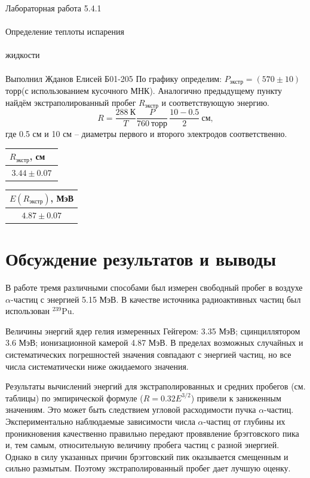 \documentclass{astroedu-lab}
\begin{document}
\begin{problem}{\huge Лабораторная работа 5.4.1\\\\Определение теплоты испарения\\\\жидкости\\\\Выполнил Жданов Елисей Б01-205}
		По графику определим: $P_\text{экстр} = (570 \pm 10)$ торр(с использованием кусочного МНК). Аналогично предыдущему пункту найдём экстраполированный пробег $R_\text{экстр}$ и соответствующую энергию.
		\begin{equation*}
			R = \frac{288 \ \text{К}}{T}\frac{P}{760 \ \text{торр}}\, \frac{10 - 0.5}{2} \ \text{см},
		\end{equation*}
		где 0.5 см и 10 см -- диаметры первого и второго электродов соответственно.
		\begin{table}[h!]
		\centering
				\begin{tabular}{|c|}
						\hline
						$R_\text{экстр}$, см $\ \ \ $ \\ \hline
						$3.44 \pm 0.07$         \\ \hline
				\end{tabular}
				\begin{tabular}{|c|}
						\hline
						$E(R_\text{экстр})$, МэВ \\ \hline
						$4.87 \pm 0.07 $            \\ \hline
				\end{tabular}      
		\end{table}
\newpage
\section{Обсуждение результатов и выводы}
	В работе тремя различными способами был измерен свободный пробег в воздухе $\alpha$-частиц  с энергией 5.15 МэВ. В качестве источника радиоактивных частиц был использован $^{239}$Pu.
	
Величины энергий ядер гелия измеренных Гейгером: 3.35 МэВ; сцинциллятором 3.6 МэВ; ионизационной камерой 4.87 МэВ. В пределах возможных случайных и систематических погрешностей значения совпадают с энергией частиц, но все числа систематически ниже ожидаемого значения.
	
	Результаты вычислений энергий для экстраполированных и средних пробегов (см. таблицы) по эмпирической формуле ($R = 0.32E^{3/2}$) привели к заниженным значениям. Это может быть следствием угловой расходимости пучка $\alpha$-частиц. Экспериментально наблюдаемые зависимости числа $\alpha$-частиц от глубины их проникновения качественно правильно передают провявление брэгговского пика и, тем самым, относительную величину пробега частиц с разной энергией. Однако в силу указанных причин брэгговский пик оказывается смещенным и сильно размытым. Поэтому экстраполированный пробег дает лучшую оценку.


\end{problem}
\end{document}
